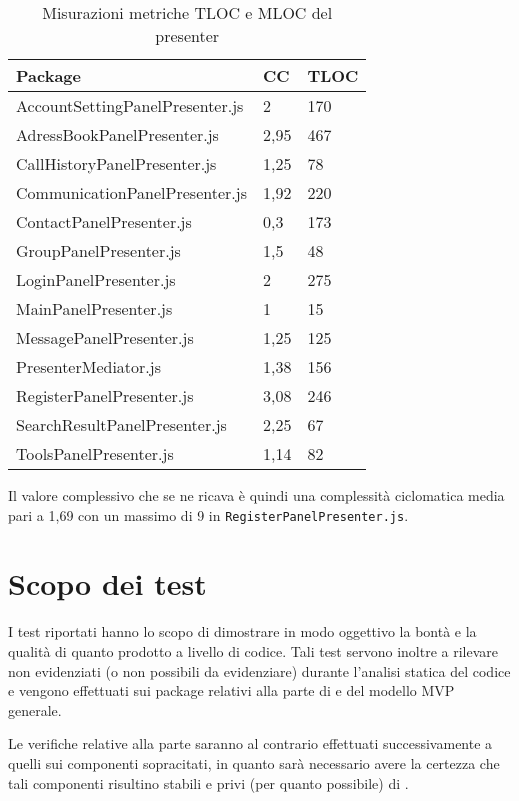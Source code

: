 \begin{table}[H]
\centering
{}
\begin{tabular}{p{}ll}
\toprule Package & CC  & TLOC\\
\midrule
AccountSettingPanelPresenter.js & 2 & 170\\
AdressBookPanelPresenter.js & 2,95 & 467\\
CallHistoryPanelPresenter.js & 1,25 & 78\\
CommunicationPanelPresenter.js & 1,92 & 220\\
ContactPanelPresenter.js & 0,3 & 173\\
GroupPanelPresenter.js & 1,5 & 48\\
LoginPanelPresenter.js & 2 & 275\\
MainPanelPresenter.js & 1 & 15\\
MessagePanelPresenter.js & 1,25 & 125\\
PresenterMediator.js & 1,38 & 156\\
RegisterPanelPresenter.js & 3,08 & 246\\
SearchResultPanelPresenter.js & 2,25 & 67\\
ToolsPanelPresenter.js & 1,14 & 82\\
\bottomrule
\end{tabular}
\caption{Misurazioni metriche TLOC e MLOC del presenter} \label{tab: metricheTLOCMLOCpresenter}
\end{table}
Il valore complessivo che se ne ricava è quindi una complessità ciclomatica media pari a 1,69 con un massimo di 9 in \texttt{RegisterPanelPresenter.js}.


\section{Scopo dei test}
I test riportati hanno lo scopo di dimostrare in modo oggettivo la bontà e la qualità di quanto prodotto a livello di codice. Tali test servono inoltre a rilevare  non evidenziati (o non possibili da evidenziare) durante l'analisi statica del codice e vengono effettuati sui package relativi alla parte di  e  del modello MVP generale.

Le verifiche relative alla parte  saranno al contrario effettuati successivamente a quelli sui componenti sopracitati, in quanto sarà necessario avere la certezza che tali componenti risultino stabili e privi (per quanto possibile) di .

